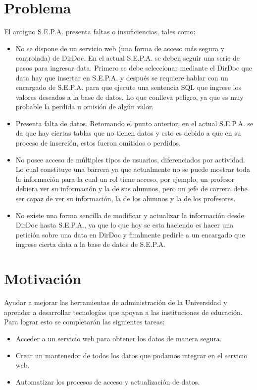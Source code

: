 \documentclass[a4paper,12pt,openany,oneside]{book}
\begin{document}
\section{Problema}
El antiguo S.E.P.A. presenta faltas o insuficiencias, tales como: 
\begin{itemize}
	\item No se dispone de un servicio web (una forma de acceso más segura y controlada) de DirDoc. En el actual S.E.P.A. se deben seguir una serie de pasos para ingresar data. Primero se debe seleccionar mediante el DirDoc que data hay que insertar en S.E.P.A. y después se requiere hablar con un encargado de S.E.P.A. para que ejecute una sentencia SQL que ingrese los valores deseados a la base de datos. Lo que conlleva peligro, ya que es muy probable la perdida u omisión de algún valor.
	\item Presenta falta de datos. Retomando el punto anterior, en el actual S.E.P.A. se da que hay ciertas tablas que no tienen datos y esto es debido a que en su proceso de inserción, estos fueron omitidos o perdidos.
	\item No posee acceso de múltiples tipos de usuarios, diferenciados por actividad. Lo cual constituye una barrera ya que actualmente no se puede mostrar toda la información para la cual un rol tiene acceso, por ejemplo, un profesor debiera ver su información y la de sus alumnos, pero un jefe de carrera debe ser capaz de ver su información, la de los alumnos y la de los profesores. 
	\item No existe una forma sencilla de modificar y actualizar la información desde DirDoc hasta S.E.P.A., ya que lo que hoy se esta haciendo es hacer una petición sobre una data en DirDoc y finalmente pedirle a un encargado que ingrese cierta data a la base de datos de S.E.P.A.
\end{itemize} 
\section{Motivación}
Ayudar a mejorar las herramientas de administración de la Universidad y aprender a desarrollar tecnologías que apoyan a las instituciones de educación.
Para lograr esto se completarán las siguientes tareas:
\begin{itemize}
	\item Acceder a un servicio web para obtener los datos de manera segura.
	\item Crear un mantenedor de todos los datos que podamos integrar en el servicio web.
	\item Automatizar los procesos de acceso y actualización de datos.
\end{itemize}
\end{document}
